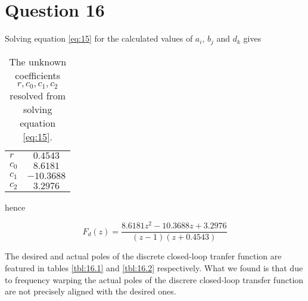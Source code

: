 \section{Question 16}

Solving equation \ref{eq:15} for the calculated values of $a_i$, $b_j$ and $d_k$
gives

\begin{table}[H]\centering
  \begin{tabular}{l|c}
  $r$     & $0.4543$    \\
  $c_0$   & $8.6181$    \\
  $c_1$   & $-10.3688$  \\
  $c_2$   & $3.2976$    \\
  \end{tabular}
  \caption{The unknown coefficients $r, c_0, c_1, c_2$ resolved from solving
    equation \ref{eq:15}.}
  \label{tbl:16}
\end{table}

hence

\begin{equation}
  F_d(z) = \dfrac{8.6181z^2 -10.3688z + 3.2976}{(z-1)(z+0.4543)}
\end{equation}

The desired and actual poles of the discrete closed-loop tranfer function are
featured in tables \ref{tbl:16.1} and \ref{tbl:16.2} respectively. What we found
is that due to frequency warping the actual poles of the discrere closed-loop
transfer function are not precisely aligned with the desired ones.

\begin{table}
\centering
{}
\end{table}
